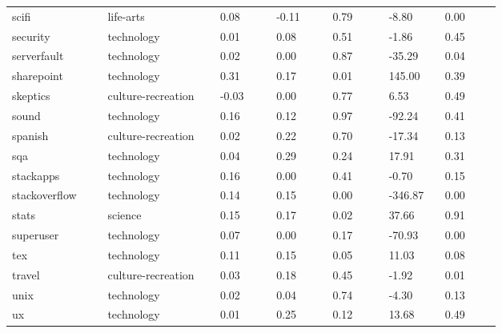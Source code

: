 \begin{longtabu}{@{}
	p{0.17\linewidth}
	p{0.2\linewidth}
	P{0.1\linewidth}
	P{0.1\linewidth}
	P{0.1\linewidth}
	P{0.1\linewidth}
	p{0.1\linewidth}@{}}
scifi            & life-arts          & 0.08           & -0.11          & 0.79   & -8.80             & 0.00             \\
security         & technology         & 0.01           & 0.08           & 0.51   & -1.86             & 0.45             \\
serverfault      & technology         & 0.02           & 0.00           & 0.87   & -35.29            & 0.04             \\
sharepoint       & technology         & 0.31           & 0.17           & 0.01   & 145.00            & 0.39             \\
skeptics         & culture-recreation & -0.03          & 0.00           & 0.77   & 6.53              & 0.49             \\
sound            & technology         & 0.16           & 0.12           & 0.97   & -92.24            & 0.41             \\
spanish          & culture-recreation & 0.02           & 0.22           & 0.70   & -17.34            & 0.13             \\
sqa              & technology         & 0.04           & 0.29           & 0.24   & 17.91             & 0.31             \\
stackapps        & technology         & 0.16           & 0.00           & 0.41   & -0.70             & 0.15             \\
stackoverflow    & technology         & 0.14           & 0.15           & 0.00   & -346.87           & 0.00             \\
stats            & science            & 0.15           & 0.17           & 0.02   & 37.66             & 0.91             \\
superuser        & technology         & 0.07           & 0.00           & 0.17   & -70.93            & 0.00             \\
tex              & technology         & 0.11           & 0.15           & 0.05   & 11.03             & 0.08             \\
travel           & culture-recreation & 0.03           & 0.18           & 0.45   & -1.92             & 0.01             \\
unix             & technology         & 0.02           & 0.04           & 0.74   & -4.30             & 0.13             \\
ux               & technology         & 0.01           & 0.25           & 0.12   & 13.68             & 0.49             \\

\end{longtabu}
